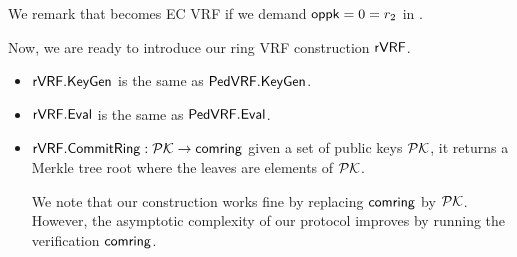 \noindent We remark that \PedVRF becomes EC VRF if we demand $\mathsf{oppk} = 0 = r_2$ in \Sign.


\smallskip

Now, we are ready to introduce our ring VRF construction  $ {\mathsf{rVRF}} $.

\begin{itemize}
	\item ${\mathsf{rVRF}}.{\mathsf{KeyGen}} $ is the same as $ {\mathsf{PedVRF}}.{\mathsf{KeyGen}}$.
	\item ${\mathsf{rVRF}}.{\mathsf{Eval}} $ is the same as $ {\mathsf{PedVRF}}.{\mathsf{Eval}}$.
	\item $ {\mathsf{rVRF}}.{\mathsf{CommitRing}}: {\mathcal{PK}} \rightarrow \mathsf{comring}$ given a set of public keys $ {\mathcal{PK}} $, it returns a Merkle tree root where the leaves are elements of  $ {\mathcal{PK}}$. 
	
	We note that our construction works fine by replacing  $ \mathsf{comring} $ by $ {\mathcal{PK}} $. However, the asymptotic complexity of our protocol improves by running the verification $ \mathsf{comring} $.
	
\end{itemize}


